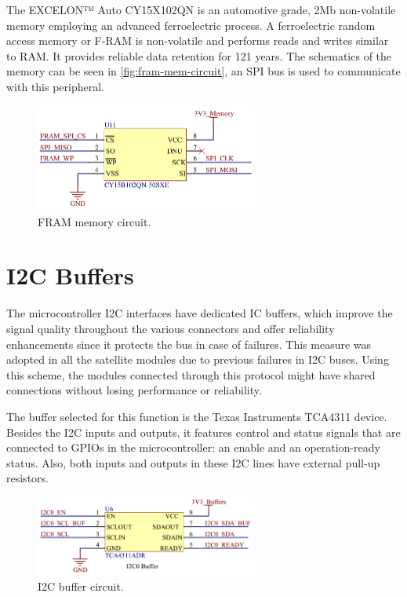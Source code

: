 The EXCELON™ Auto CY15X102QN is an automotive grade, 2Mb non-volatile memory employing an advanced ferroelectric process. A ferroelectric random access memory or F-RAM is non-volatile and performs reads and writes similar to RAM. It provides reliable data retention for 121 years. The schematics of the memory can be seen in \autoref{fig:fram-mem-circuit}, an SPI bus is used to communicate with this peripheral.

\begin{figure}[!ht]
    \begin{center}
        \includegraphics[width=0.65\textwidth]{figures/fram-memory-circuit.png}
        \caption{FRAM memory circuit.}
        \label{fig:fram-mem-circuit}
    \end{center}
\end{figure}

\section{I2C Buffers}

The microcontroller I2C interfaces have dedicated IC buffers, which improve the signal quality throughout the various connectors and offer reliability enhancements since it protects the bus in case of failures. This measure was adopted in all the satellite modules due to previous failures in I2C buses. Using this scheme, the modules connected through this protocol might have shared connections without losing performance or reliability.

The buffer selected for this function is the Texas Instruments TCA4311 device. Besides the I2C inputs and outputs, it features control and status signals that are connected to GPIOs in the microcontroller: an enable and an operation-ready status. Also, both inputs and outputs in these I2C lines have external pull-up resistors.

\begin{figure}[!ht]
    \begin{center}
        \includegraphics[width=0.65\textwidth]{figures/i2c-buffer-circuit.png}
        \caption{I2C buffer circuit.}
        \label{fig:i2c-buffer-circuit}
    \end{center}
\end{figure}

